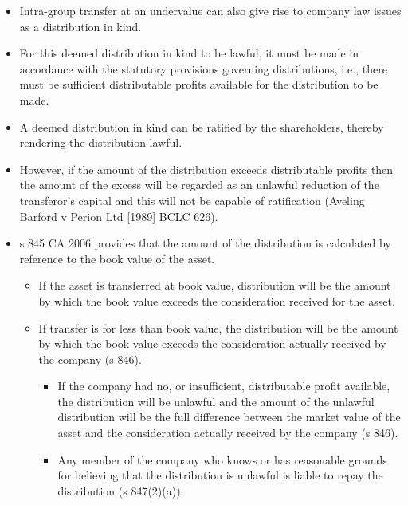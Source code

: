 \documentclass[
]{article}
\providecommand{\tightlist}{%
  \setlength{\itemsep}{0pt}\setlength{\parskip}{0pt}}
\begin{document}
\begin{itemize}
\tightlist
\item
  Intra-group transfer at an undervalue can also give rise to company
  law issues as a distribution in kind.
\item
  For this deemed distribution in kind to be lawful, it must be made in
  accordance with the statutory provisions governing distributions,
  i.e., there must be sufficient distributable profits available for the
  distribution to be made.
\item
  A deemed distribution in kind can be ratified by the shareholders,
  thereby rendering the distribution lawful.
\item
  However, if the amount of the distribution exceeds distributable
  profits then the amount of the excess will be regarded as an unlawful
  reduction of the transferor's capital and this will not be capable of
  ratification (Aveling Barford v Perion Ltd {[}1989{]} BCLC 626).
\item
  s 845 CA 2006 provides that the amount of the distribution is
  calculated by reference to the book value of the asset.

  \begin{itemize}
  \tightlist
  \item
    If the asset is transferred at book value, distribution will be the
    amount by which the book value exceeds the consideration received
    for the asset.
  \item
    If transfer is for less than book value, the distribution will be
    the amount by which the book value exceeds the consideration
    actually received by the company (s 846).

    \begin{itemize}
    \tightlist
    \item
      If the company had no, or insufficient, distributable profit
      available, the distribution will be unlawful and the amount of the
      unlawful distribution will be the full difference between the
      market value of the asset and the consideration actually received
      by the company (s 846).
    \item
      Any member of the company who knows or has reasonable grounds for
      believing that the distribution is unlawful is liable to repay the
      distribution (s 847(2)(a)).
    \end{itemize}
  \end{itemize}
\end{itemize}
\end{document}

